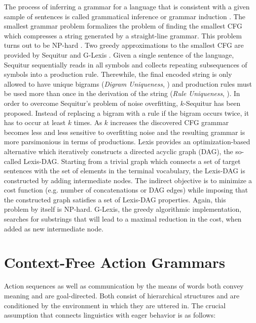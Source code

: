 \documentclass[colorinlistoftodos]{article}
\theoremstyle{definition}
\begin{document}
The process of inferring a grammar for a language that is consistent with a given sample of sentences is called grammatical inference or grammar induction \citep{Levelt_2008}. The smallest grammar problem \citep{Charikar_2005, Siyari_2016} formalizes the problem of finding the smallest CFG which compresses a string generated by a straight-line grammar. This problem turns out to be NP-hard \citep{Charikar_2005}. Two greedy approximations to the smallest CFG are provided by Sequitur \citep{Manning_1997} and G-Lexis \citep{Siyari_2016b}.
Given a single sentence of the language, Sequitur sequentially reads in all symbols and collects repeating subsequences of symbols into a production rule. Therewhile, the final encoded string is only allowed to have unique bigrams (\textit{Digram Uniqueness}, \citep{Manning_1997}) and production rules must be used more than once in the derivation of the string (\textit{Rule Uniqueness}, \citep{Manning_1997}).
In order to overcome Sequitur's problem of noise overfitting, $k$-Sequitur \citep{Stout_2018} has been proposed. Instead of replacing a bigram with a rule if the bigram occurs twice, it has to occur at least $k$ times. As $k$ increases the discovered CFG grammar becomes less and less sensitive to overfitting noise and the resulting grammar is more parsimonious in terms of productions. 
Lexis \citep{Siyari_2016b} provides an optimization-based alternative which iteratively constructs a directed acyclic graph (DAG), the so-called Lexis-DAG. Starting from a trivial graph which connects a set of target sentences with the set of elements in the terminal vocabulary, the Lexis-DAG is constructed by adding intermediate nodes. The indirect objective is to minimize a cost function (e.g. number of concatenations or DAG edges) while imposing that the constructed graph satisfies a set of Lexis-DAG properties. Again, this problem by itself is NP-hard. G-Lexis, the greedy algorithmic implementation, searches for substrings that will lead to a maximal reduction in the cost, when added as new intermediate node.


\newpage
\section{Context-Free Action Grammars}

 Action sequences as well as communication by the means of words both convey meaning and are goal-directed. Both consist of hierarchical structures and are conditioned by the environment in which they are uttered in. The crucial assumption that connects linguistics with eager behavior is as follows: 
\end{document}
